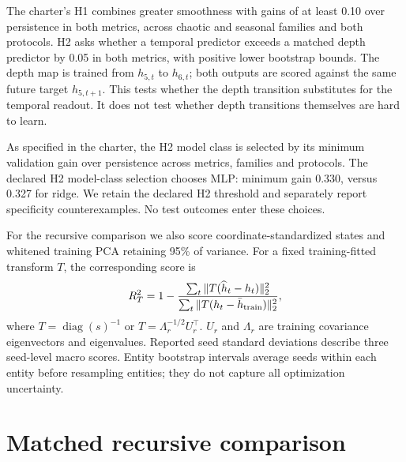 \documentclass[10pt,a4paper,twocolumn]{article}
\begin{document}
The charter's H1 combines greater smoothness with gains of at least 0.10 over persistence in both metrics, across chaotic and seasonal families and both protocols.
H2 asks whether a temporal predictor exceeds a matched depth predictor by 0.05 in both metrics, with positive lower bootstrap bounds.
The depth map is trained from $h_{5,t}$ to $h_{6,t}$; both outputs are scored against the same future target $h_{5,t+1}$.
This tests whether the depth transition substitutes for the temporal readout.
It does not test whether depth transitions themselves are hard to learn.

As specified in the charter, the H2 model class is selected by its minimum validation gain over persistence across metrics, families and protocols.
The declared H2 model-class selection chooses MLP: minimum gain 0.330, versus 0.327 for ridge.
We retain the declared H2 threshold and separately report specificity counterexamples.
No test outcomes enter these choices.

For the recursive comparison we also score coordinate-standardized states and whitened training PCA retaining 95\% of variance.
For a fixed training-fitted transform $T$, the corresponding score is
\begin{equation}
 R_T^2=1-\frac{\sum_t\|T(\widehat h_t-h_t)\|_2^2}
                    {\sum_t\|T(h_t-\bar h_{\rm train})\|_2^2},
\end{equation}
where $T=\operatorname{diag}(s)^{-1}$ or $T=\Lambda_r^{-1/2}U_r^\top$.
$U_r$ and $\Lambda_r$ are training covariance eigenvectors and eigenvalues.
Reported seed standard deviations describe three seed-level macro scores.
Entity bootstrap intervals average seeds within each entity before resampling entities; they do not capture all optimization uncertainty.

\section{Matched recursive comparison}
\begin{table}[t]
\centering\small
\setlength{\tabcolsep}{3pt}

\caption{Main validation $R^2$ comparison on four unseen entities per dataset. One analysis step advances 16 observations. All models and all five recursive horizons use identical reporting starts within each dataset. Neural values give the mean $\pm$ sample standard deviation over three seeds. Ridge is one deterministic fit. A horizon-specific training-target mean scores zero; large negative scores are retained.}
\label{tab:consistent}
\end{table}
\end{document}
